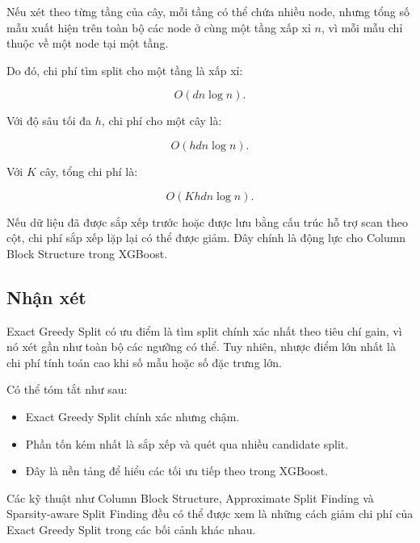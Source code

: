 Nếu xét theo từng tầng của cây, mỗi tầng có thể chứa nhiều node, nhưng tổng số mẫu xuất hiện trên toàn bộ các node ở cùng một tầng xấp xỉ $n$, vì mỗi mẫu chỉ thuộc về một node tại một tầng.

Do đó, chi phí tìm split cho một tầng là xấp xỉ:

\[
O(dn \log n).
\]

Với độ sâu tối đa $h$, chi phí cho một cây là:

\[
O(hdn \log n).
\]

Với $K$ cây, tổng chi phí là:

\[
O(Khdn \log n).
\]

Nếu dữ liệu đã được sắp xếp trước hoặc được lưu bằng cấu trúc hỗ trợ scan theo cột, chi phí sắp xếp lặp lại có thể được giảm. Đây chính là động lực cho Column Block Structure trong XGBoost.

\subsection{Nhận xét}

Exact Greedy Split có ưu điểm là tìm split chính xác nhất theo tiêu chí gain, vì nó xét gần như toàn bộ các ngưỡng có thể. Tuy nhiên, nhược điểm lớn nhất là chi phí tính toán cao khi số mẫu hoặc số đặc trưng lớn.

Có thể tóm tắt như sau:

\begin{itemize}
    \item Exact Greedy Split chính xác nhưng chậm.
    \item Phần tốn kém nhất là sắp xếp và quét qua nhiều candidate split.
    \item Đây là nền tảng để hiểu các tối ưu tiếp theo trong XGBoost.
\end{itemize}

Các kỹ thuật như Column Block Structure, Approximate Split Finding và Sparsity-aware Split Finding đều có thể được xem là những cách giảm chi phí của Exact Greedy Split trong các bối cảnh khác nhau.
